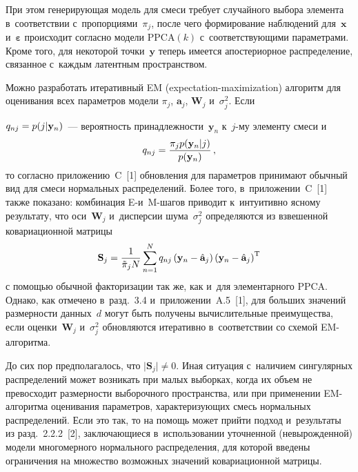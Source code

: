 \begin{multicols}{2}
     При этом генерирующая модель для смеси требует случайного выбора 
элемента в~соответствии с~пропорциями~$\pi_j$, после чего формирование 
наблюдений для~$\mathbf{x}$ и~$\boldsymbol{\varepsilon}$ происходит согласно модели 
PPCA$(k)$  с~соответствующими параметрами. Кроме того, для некоторой 
точки~$\mathbf{y}$ теперь имеется апостериорное распределение, связанное 
с~каждым латентным пространством.
     
     Можно разработать итеративный EM (expectation-maximization)
     алгоритм для оценивания всех 
параметров модели $\pi_j$, $\mathbf{a}_j$, $\mathbf{W}_j$ и~$\sigma_j^2$. 
Если\linebreak
\vspace*{-12pt}

\columnbreak

\noindent
$q_{nj}\hm= p(j\vert \mathbf{y}_n)$~--- вероятность 
принадлежности~$\mathbf{y}_n$ к~$j$-му элементу смеси и
     $$
     q_{nj}= \displaystyle\frac{\displaystyle \pi_j p(\mathbf{y}_n\vert j)\mathstrut}{\displaystyle p(\mathbf{y}_n)\mathstrut}\,,
     $$
     то согласно приложению~C~[1] обновления для параметров принимают 
обычный вид для смеси нормальных распределений. Более того, 
в~приложении~C~[1] также показано: комбинация E-\linebreak и~M-ша\-гов приводит 
к~интуитивно ясному результату, что оси~$\mathbf{W}_j$ и~дисперсии 
шума~$\sigma_j^2$ определяются из взвешенной ковариационной матрицы
     $$
     \mathbf{S}_j= \displaystyle\frac{\displaystyle 1\mathstrut}{\displaystyle \tilde{\pi}_j N\mathstrut} \sum\limits^N_{n=1} q_{nj} \left( 
\mathbf{y}_n -\hat{\mathbf{a}}_j\right) \left( \mathbf{y}_n-
\hat{\mathbf{a}}_j\right)^{\mathrm{T}}
     $$
с помощью обычной факторизации так же, как и~для элементарного PPCA. 
Однако, как отмечено в~разд.~3.4 и~приложении~A.5~[1], для больших 
значений размерности данных~$d$ могут быть получены вычислительные 
преимущества, если оценки~$\mathbf{W}_j$ и~$\sigma^2_j$ обновляются 
итеративно в~соответствии со схемой EM-ал\-го\-ритма.

     До сих пор предполагалось, что $\vert \mathbf{S}_j\vert\not= 0$. Иная 
ситуация с~наличием сингулярных распределений может возникать при малых 
выборках, когда их объем не превосходит размерности выборочного 
пространства, или при применении EM-ал\-го\-рит\-ма оценивания параметров, 
характеризующих смесь нормальных распределений. Если это так, то на 
помощь может прийти подход и~результаты из разд.~2.2.2~[2], заключающиеся 
в~использовании уточненной (невырожденной) модели многомерного 
нормального распределения, для которой введены ограничения на множество 
возможных значений ковариационной матрицы.
     

\end{multicols}
